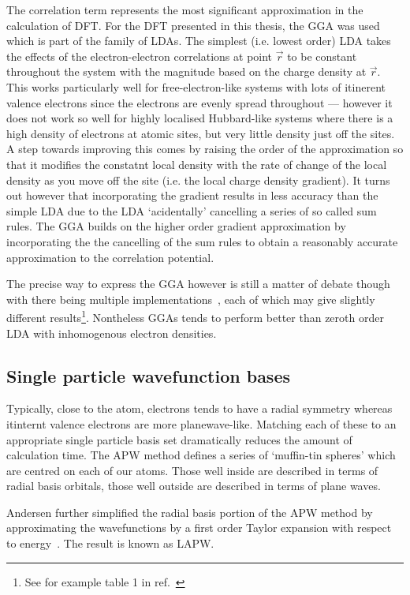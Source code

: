 The correlation term represents the most significant approximation in the calculation of \ac{DFT}. For the \ac{DFT} presented in this thesis, the \ac{GGA} was used which is part of the family of \acp{LDA}. The simplest (i.e. lowest order) \ac{LDA} takes the effects of the electron-electron correlations at point $\vec{r}$ to be constant throughout the system with the magnitude based on the charge density at $\vec{r}$. This works particularly well for free-electron-like systems with lots of itinerent valence electrons since the electrons are evenly spread throughout --- however it does not work so well for highly localised Hubbard-like systems where there is a high density of electrons at atomic sites, but very little density just off the sites. A step towards improving this comes by raising the order of the approximation so that it modifies the constatnt local density with the rate of change of the local density as you move off the site (i.e. the local charge density gradient). It turns out however that incorporating the gradient results in less accuracy than the simple \ac{LDA} due to the \ac{LDA} `acidentally' cancelling a series of so called sum rules. The \ac{GGA} builds on the higher order gradient approximation by incorporating the the cancelling of the sum rules to obtain a reasonably accurate approximation to the correlation potential. 

The precise way to express the \ac{GGA} however is still a matter of debate though with there being multiple implementations~\cite{Perdew1996, Perdew1986}, each of which may give slightly different results\footnote{See for example table 1 in ref.~\cite{Perdew1996}}. Nontheless \acp{GGA} tends to perform better than zeroth order \ac{LDA} with inhomogenous electron densities.

\subsection{Single particle wavefunction bases}

Typically, close to the atom, electrons tends to have a radial symmetry whereas itinternt valence electrons are more planewave-like. Matching each of these to an appropriate single particle basis set dramatically reduces the amount of calculation time. The \ac{APW} method defines a series of `muffin-tin spheres' which are centred on each of our atoms. Those well inside are described in terms of radial basis orbitals, those well outside are described in terms of plane waves.

Andersen further simplified the radial basis portion of the \ac{APW} method by approximating the wavefunctions by a first order Taylor expansion with respect to energy~\cite{Andersen1975}. The result is known as \ac{LAPW}.

